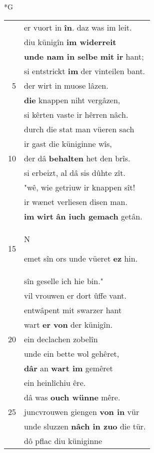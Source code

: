 \documentclass[8pt,a4paper,notitlepage]{article}
\begin{document}
\newpage
\begin{table}[ht]
\begin{minipage}[t]{0.5\linewidth}
\small
\begin{center}*G
\end{center}
\begin{tabular}{rl}
 & er vuort in \textbf{în}. daz was im leit.\\ 
 & diu künigîn \textbf{im widerreit}\\ 
 & \textbf{unde nam in selbe} \textbf{mit} \textbf{ir} hant;\\ 
 & si entstrickt \textbf{im} der vinteilen bant.\\ 
5 & der wirt in muose lâzen.\\ 
 & \textbf{die} knappen niht vergâzen,\\ 
 & si kêrten vaste ir hêrren nâch.\\ 
 & durch die stat man vüeren sach\\ 
 & ir gast die küniginne wîs,\\ 
10 & der dâ \textbf{behalten} het den brîs.\\ 
 & si erbeizt, al dâ sis dûhte zît.\\ 
 & "wê, wie getriuw ir knappen sît!\\ 
 & ir wænet verliesen disen man.\\ 
 & \textbf{im} \textbf{wirt} \textbf{ân iuch gemach} getân.\\ 
15 & \begin{large}N\end{large}emet sîn ors unde vüeret \textbf{ez} hin.\\ 
 & sîn geselle ich hie bin."\\ 
 & vil vrouwen er dort ûffe vant.\\ 
 & entwâpent mit swarzer hant\\ 
 & wart \textbf{er von} der künigîn.\\ 
20 & ein declachen zobelîn\\ 
 & unde ein bette wol gehêret,\\ 
 & \textbf{dâr} an \textbf{wart im} gemêret\\ 
 & ein heinlîchiu êre.\\ 
 & dâ was \textbf{ouch wünne} mêre.\\ 
25 & juncvrouwen giengen \textbf{von in} vür\\ 
 & unde sluzzen \textbf{nâch in zuo} die tür.\\ 
 & dô pflac diu küniginne\\ 

\end{tabular}
\end{minipage}
\end{table}
\end{document}
